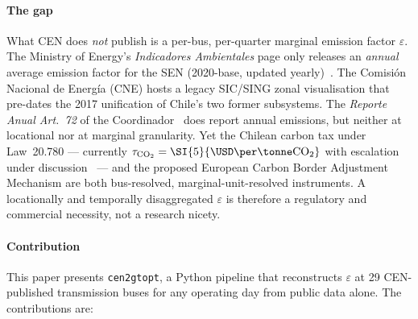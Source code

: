\paragraph{The gap}
What CEN does \emph{not} publish is a per-bus, per-quarter marginal
emission factor $\varepsilon$.  The Ministry of Energy's
\textit{Indicadores Ambientales} page only releases an
\emph{annual} average emission factor for the SEN
(2020-base, updated yearly)~\cite{MinEnergiaIndAmb}.  The Comisi\'on
Nacional de Energ\'ia (CNE) hosts a legacy SIC/SING zonal
visualisation that pre-dates the 2017 unification of Chile's
two former subsystems.  The \textit{Reporte Anual Art.~72} of the
Coordinador~\cite{CENArt722024} does report annual emissions, but
neither at locational nor at marginal granularity.  Yet the Chilean
carbon tax under Law~20.780 — currently
$\tau_{\mathrm{CO}_2}=\SI{5}{\USD\per\tonne\mathrm{CO}_2}$ with
escalation under discussion~\cite{Bonvallet2016} — and the proposed
European Carbon Border Adjustment Mechanism are both bus-resolved,
marginal-unit-resolved instruments.  A locationally and temporally
disaggregated $\varepsilon$ is therefore a regulatory and commercial
necessity, not a research nicety.

\paragraph{Contribution}
This paper presents \texttt{cen2gtopt}, a Python pipeline that
reconstructs $\varepsilon$ at \num{29} CEN-published transmission
buses for any operating day from public data alone.  The
contributions are:


